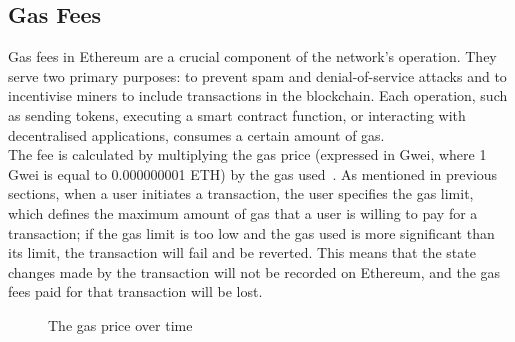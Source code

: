 \subsection{Gas Fees}
Gas fees in Ethereum are a crucial component of the network's operation. They serve two primary purposes: to prevent spam and denial-of-service attacks and to incentivise miners to include transactions in the blockchain. Each operation, such as sending tokens, executing a smart contract function, or interacting with decentralised applications, consumes a certain amount of gas.
\\[3mm]
The fee is calculated by multiplying the gas price (expressed in Gwei, where 1 Gwei is equal to 0.000000001 ETH) by the gas used~\cite{noauthor_gas_nodate}. As mentioned in previous sections, when a user initiates a transaction, the user specifies the gas limit, which defines the maximum amount of gas that a user is willing to pay for a transaction; if the gas limit is too low and the gas used is more significant than its limit, the transaction will fail and be reverted. This means that the state changes made by the transaction will not be recorded on Ethereum, and the gas fees paid for that transaction will be lost.

\begin{figure}[!htb]
    \centering
    \caption{The gas price over time}
    \label{fig:gwei_over_time}
\end{figure}

